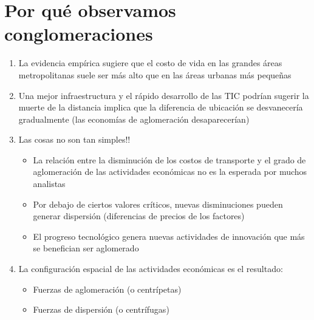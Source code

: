 \section{Por qué observamos conglomeraciones}
\begin{enumerate}
    \item La evidencia empírica sugiere que el costo de vida en las grandes áreas metropolitanas suele ser más alto que en las áreas urbanas más pequeñas 
    \item Una mejor infraestructura y el rápido desarrollo de las TIC podrían sugerir la muerte de la distancia  implica que la diferencia de ubicación se desvanecería gradualmente (las economías de aglomeración desaparecerían) 
    \item Las cosas no son tan simples!! 
	\begin{itemize}
	    \item La relación entre la disminución de los costos de transporte y el grado de aglomeración de las actividades económicas no es la esperada por muchos analistas 
	    \item Por debajo de ciertos valores críticos, nuevas disminuciones pueden generar dispersión (diferencias de precios de los factores) 
	    \item El progreso tecnológico genera nuevas actividades de innovación que más se benefician ser aglomerado 
	\end{itemize}
    \item La configuración espacial de las actividades económicas es el resultado: 
	\begin{itemize}
	    \item Fuerzas de aglomeración (o centrípetas) 
	    \item Fuerzas de dispersión (o centrífugas)
	\end{itemize}
\end{enumerate}

